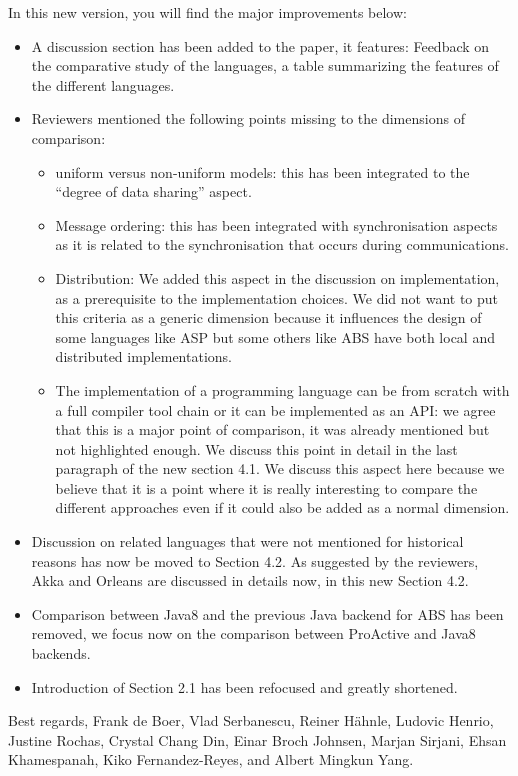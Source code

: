 \documentclass{article}
\begin{document}
In this new version, you will find the major improvements below:
\begin{itemize}
\item A discussion section has been added to the paper, it features: Feedback on the 
comparative study of the languages, a table summarizing the features of the different 
languages.
\item Reviewers mentioned the following points missing to the dimensions of comparison: 
\begin{itemize}
\item uniform versus non-uniform models: this has been integrated to the ``degree of data 
sharing'' aspect.
\item Message ordering: this has been integrated with synchronisation aspects as it is 
related to the synchronisation that occurs during communications.
\item Distribution: We added this aspect in the discussion on implementation, as a 
prerequisite to the implementation choices. We did not want to put this criteria as a 
generic dimension because it influences the design of some languages like ASP but some 
others like ABS have both local and distributed implementations.
\item The implementation of a programming language can be from scratch with a full 
compiler tool chain or it can be implemented as an API: we agree that this is a major 
point of comparison, it was already mentioned but not highlighted enough. We discuss this 
point in detail in the last paragraph of the new section 4.1. We discuss this aspect here 
because we believe that it is a point where it is really interesting to compare the 
different approaches even if it could also be added as a normal dimension.
\end{itemize}
\item Discussion on  related languages that were not mentioned for historical reasons has 
now be moved to Section 4.2. As suggested by the reviewers, Akka and Orleans are 
discussed in details now, in this new Section 4.2.
\item Comparison between Java8 and the previous Java backend for ABS has been removed, we 
focus now on the comparison between ProActive and Java8 backends.
\item Introduction of Section 2.1 has been refocused and greatly shortened.

\end{itemize}


\noindent
Best regards,
\newline
\noindent
Frank de Boer, Vlad Serbanescu,
	Reiner H\"ahnle,
	Ludovic Henrio, Justine Rochas,
	Crystal Chang Din, Einar Broch Johnsen,
	Marjan Sirjani,
	Ehsan Khamespanah,
	Kiko Fernandez-Reyes, and Albert Mingkun Yang.
\end{document}
